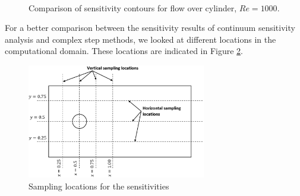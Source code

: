 \documentclass[12pt]{aiaa-pretty}
\begin{document}
\begin{figure}[H]
{	}
	\\
	\quad
	\caption{Comparison of sensitivity contours for flow over cylinder, $Re = 1000$.}
	\label{fig:cylinderSensitivityContourRE1000}
\end{figure}
%

For a better comparison between the sensitivity results of continuum sensitivity analysis and complex step methods, we looked at different locations in the computational domain. These locations are indicated in Figure \ref{fig:cylinderSampleLocations}.

%
\begin{figure}[H]
	\centering
	\includegraphics[height=5.0cm]{figure/cylinder/sampling_location.png}
	\caption{Sampling locations for the sensitivities}
	\label{fig:cylinderSampleLocations}
\end{figure}
%
\end{document}
